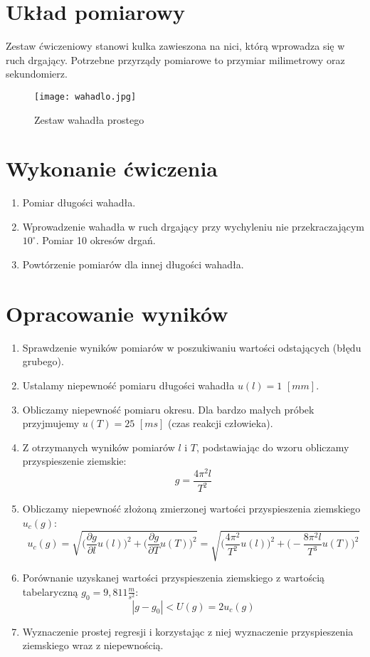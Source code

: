 \documentclass{article}
\begin{document}
\section{Układ pomiarowy}
Zestaw ćwiczeniowy stanowi kulka zawieszona na nici, którą wprowadza się w ruch drgający. Potrzebne przyrządy pomiarowe to przymiar milimetrowy oraz sekundomierz.

\begin{figure}[H]
	\begin{center}
	\texttt{[image: wahadlo.jpg]}
	\end{center}
	\caption{Zestaw wahadła prostego}
\end{figure}
\section{Wykonanie ćwiczenia}
\begin{enumerate}
	\item Pomiar długości wahadła.
	\item Wprowadzenie wahadła w ruch drgający przy wychyleniu nie przekraczającym $10^\circ$. Pomiar 10 okresów drgań.
	\item Powtórzenie pomiarów dla innej długości wahadła.
\end{enumerate}
	



\section{Opracowanie wyników}
\begin{enumerate}
	\item Sprawdzenie wyników pomiarów w poszukiwaniu wartości odstających (błędu grubego).
	\item Ustalamy niepewność pomiaru długości wahadła $u(l) = 1$ $[mm]$.
	\item Obliczamy niepewność pomiaru okresu. Dla bardzo małych próbek przyjmujemy $u(T) = 25$ $[ms]$ (czas reakcji człowieka).
	\item Z otrzymanych wyników pomiarów $l$ i $T$, podstawiając do wzoru obliczamy przyspieszenie ziemskie:
	$$g = \frac{4\pi^{2}l}{T^2}$$
	\item Obliczamy niepewność złożoną zmierzonej wartości przyspieszenia ziemskiego $u_{c}(g)$:
	$$ u_{c}(g) = \sqrt{\bigg(\frac{\partial g}{\partial l}u(l)\bigg)^2+\bigg(\frac{\partial g}{\partial T}u(T)\bigg)^2} = \sqrt{\bigg(\frac{4\pi^{2}}{T^{2}}u(l)\bigg)^2+\bigg(-\frac{8\pi^{2}l}{T^{3}}u(T)\bigg)^2} $$
	\item Porównanie uzyskanej wartości przyspieszenia ziemskiego z wartością tabelaryczną $g_{0}=9,811 \frac{m}{s^{2}}$:
	$$ |g-g_{0}|<U(g)=2u_{c}(g)$$
	\item Wyznaczenie prostej regresji i korzystając z niej wyznaczenie przyspieszenia ziemskiego wraz z niepewnością.
\end{enumerate}
\end{document}
